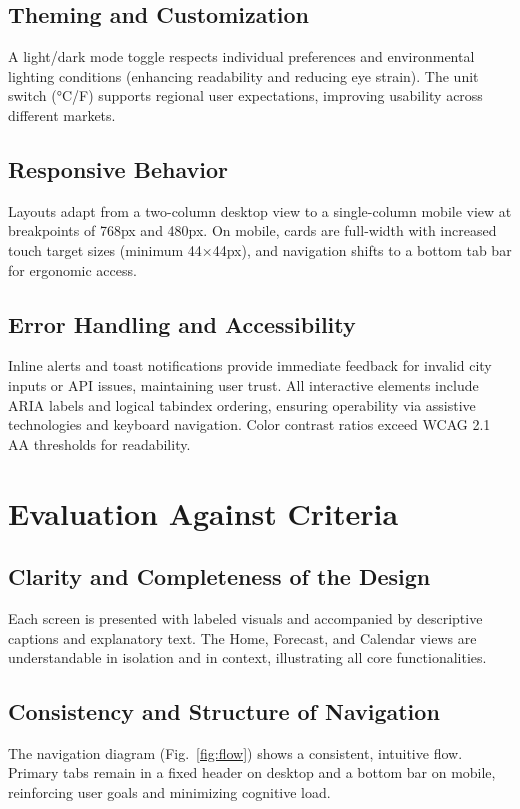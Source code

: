 \documentclass[11pt,a4paper]{article}
\begin{document}
\subsection{Theming and Customization}
A light/dark mode toggle respects individual preferences and environmental lighting conditions (enhancing readability and reducing eye strain). The unit switch (°C/\textdegree F) supports regional user expectations, improving usability across different markets.

\subsection{Responsive Behavior}
Layouts adapt from a two-column desktop view to a single-column mobile view at breakpoints of 768px and 480px. On mobile, cards are full-width with increased touch target sizes (minimum 44×44px), and navigation shifts to a bottom tab bar for ergonomic access.

\subsection{Error Handling and Accessibility}
Inline alerts and toast notifications provide immediate feedback for invalid city inputs or API issues, maintaining user trust. All interactive elements include ARIA labels and logical tabindex ordering, ensuring operability via assistive technologies and keyboard navigation. Color contrast ratios exceed WCAG 2.1 AA thresholds for readability.

\section{Evaluation Against Criteria}
\subsection{Clarity and Completeness of the Design}
Each screen is presented with labeled visuals and accompanied by descriptive captions and explanatory text. The Home, Forecast, and Calendar views are understandable in isolation and in context, illustrating all core functionalities.

\subsection{Consistency and Structure of Navigation}
The navigation diagram (Fig.~\ref{fig:flow}) shows a consistent, intuitive flow. Primary tabs remain in a fixed header on desktop and a bottom bar on mobile, reinforcing user goals and minimizing cognitive load.
\end{document}
